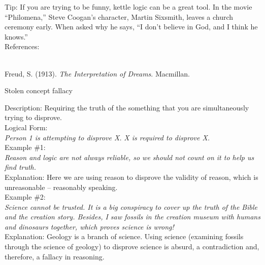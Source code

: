 \documentclass[a4paper,12pt,single,pdftex]{scrartcl}
\begin{document}
    
      Tip: If you are trying to be funny, kettle logic can be a great tool. In the movie “Philomena,” Steve Coogan’s character, Martin Sixsmith, leaves a church ceremony early. When asked why he says, “I don’t believe in God, and I think he knows.”
    \\

    References:

    
      
        
      \\

      
        
          Freud, S. (1913). {\it The Interpretation of Dreams}. Macmillan.
        
      
    
  

Stolen concept fallacy
    
      
        Description: Requiring the truth of the something that you are simultaneously trying to disprove.
      \\

      
        Logical Form:
      \\

      
        {\em Person 1 is attempting to disprove X.} \newline
{\em X is required to disprove X.}
      \\

      
        Example \#1:
      \\

      
        {\em Reason and logic are not always reliable, so we should not count on it to help us find truth.}
      \\

      
        Explanation: Here we are using reason to disprove the validity of reason, which is unreasonable -- reasonably speaking.
      \\

      
        Example \#2:
      \\

      
        {\em Science cannot be trusted.  It is a big conspiracy to cover up the truth of the Bible and the creation story.  Besides, I saw fossils in the creation museum with humans and dinosaurs together, which proves science is wrong!}
      \\

      
        Explanation: Geology is a branch of science.  Using science (examining fossils through the science of geology) to disprove science is absurd, a contradiction and, therefore, a fallacy in reasoning.
      \\
\end{document}
